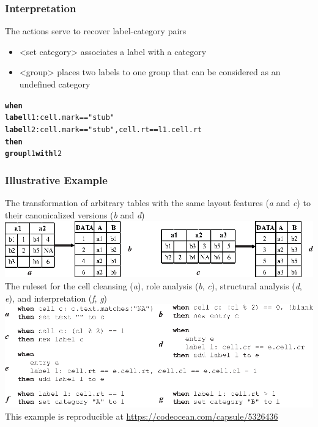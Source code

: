\documentclass[10pt]{beamer}
\begin{document}
\begin{frame}[fragile]
\frametitle{Interpretation}
The actions serve to recover label-category pairs
\begin{itemize}
	\item \alert{<set category>} associates a label with a category
	\item \alert{<group>} places two labels to one group that can be considered as an undefined category
\end{itemize}
\footnotesize{
\begin{example}
\begin{alltt}
\textbf{when}
  \textbf{label} l1: cell.mark == "stub"
  \textbf{label} l2: cell.mark == "stub", cell.rt == l1.cell.rt
\textbf{then}
  \textbf{group} l1 \textbf{with} l2
\end{alltt}
\end{example}
}
\end{frame}

\begin{frame}
\frametitle{Illustrative Example}
\scriptsize{The transformation of arbitrary tables with the same layout features (\textit{a} and \textit{c}) to their canonicalized versions (\textit{b} and \textit{d})}
\includegraphics[width=0.7\linewidth]{illustrative_example}
\scriptsize{The ruleset for the cell cleansing (\textit{a}), role analysis (\textit{b}, \textit{c}), structural analysis (\textit{d}, \textit{e}), and interpretation (\textit{f}, \textit{g})}
\includegraphics[width=0.75\linewidth]{illustrative_example_rules}
\tiny{This example is reproducible at \url{https://codeocean.com/capsule/5326436}}
\end{frame}
\end{document}
